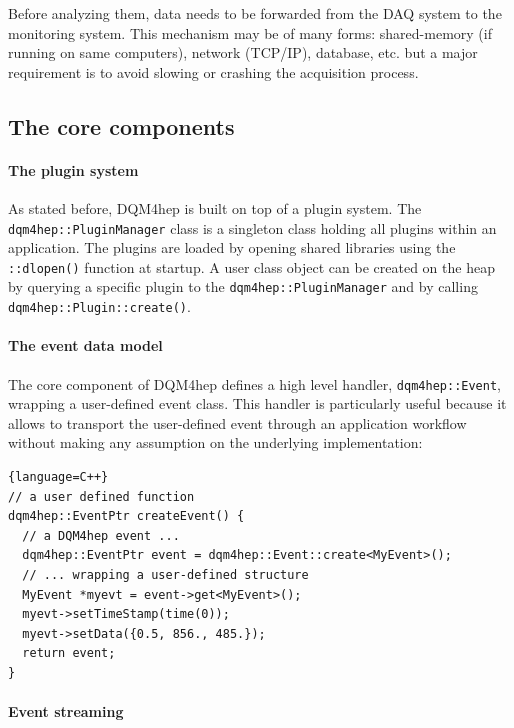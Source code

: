 \documentclass{webofc}
\begin{document}
Before analyzing them, data needs to be forwarded from the DAQ system to the monitoring system.
This mechanism may be of many forms: shared-memory (if running on same computers), network (TCP/IP), database, etc. but a major requirement is to avoid slowing or crashing the acquisition process.

\subsection{The core components}
\label{subsec:core}

\paragraph{The plugin system}

As stated before, DQM4hep is built on top of a plugin system.
The \texttt{dqm4hep::PluginManager} class is a singleton class holding all plugins within an application.
The plugins are loaded by opening shared libraries using the \texttt{::dlopen()} function at startup.
A user class object can be created on the heap by querying a specific plugin to the \texttt{dqm4hep::PluginManager} and
by calling \texttt{dqm4hep::Plugin::create()}.

\paragraph{The event data model}

The core component of DQM4hep defines a high level handler, \texttt{dqm4hep::Event}, wrapping a user-defined event class.
This handler is particularly useful because it allows to transport the user-defined event through an application
workflow without making any assumption on the underlying implementation:

\begin{lstlisting}{language=C++}
// a user defined function
dqm4hep::EventPtr createEvent() {
  // a DQM4hep event ...
  dqm4hep::EventPtr event = dqm4hep::Event::create<MyEvent>();
  // ... wrapping a user-defined structure
  MyEvent *myevt = event->get<MyEvent>();
  myevt->setTimeStamp(time(0));
  myevt->setData({0.5, 856., 485.});
  return event;
}
\end{lstlisting}

\paragraph{Event streaming}
\end{document}

